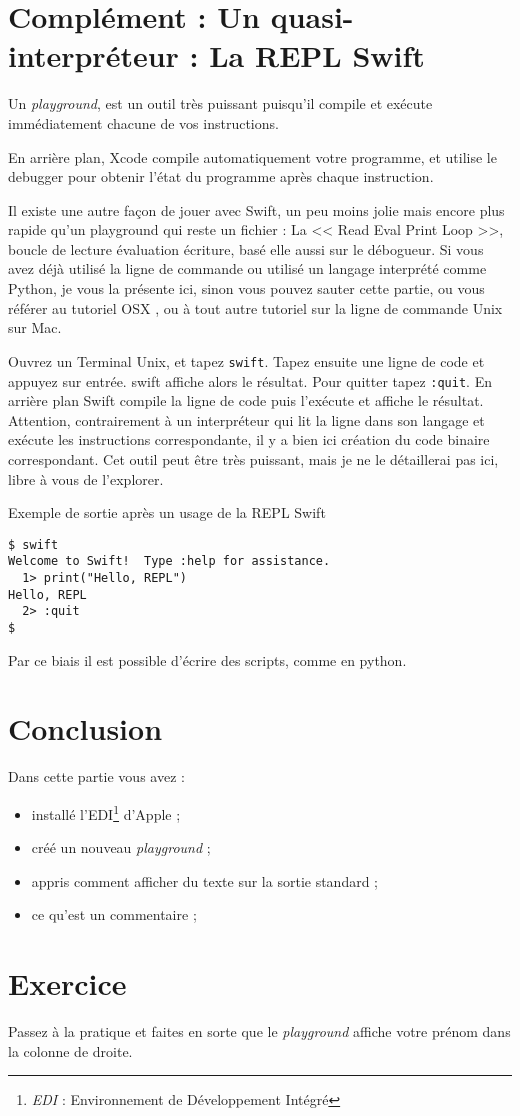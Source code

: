 \section{Complément : Un quasi-interpréteur : La REPL Swift}
Un \emph{playground}, est un outil très puissant
puisqu’il compile et exécute immédiatement
chacune de vos instructions.

En arrière plan, Xcode compile automatiquement votre programme,
et utilise le debugger pour obtenir l’état du programme après chaque instruction.

Il existe une autre façon de jouer avec Swift,
un peu moins jolie mais encore plus rapide qu’un playground
qui reste un fichier :
La << Read Eval Print Loop >>, boucle de lecture évaluation écriture,
basé elle aussi sur le débogueur.
Si vous avez déjà utilisé la ligne de commande
ou utilisé un langage interprété comme Python,
je vous la présente ici, sinon vous pouvez sauter cette partie,
ou vous référer au tutoriel OSX ,
ou à tout autre tutoriel sur la ligne de commande Unix sur Mac.

Ouvrez un Terminal Unix, et tapez \verb"swift".
Tapez ensuite une ligne de code et appuyez sur entrée.
swift affiche alors le résultat.
Pour quitter tapez \verb":quit".
En arrière plan Swift compile la ligne de code
puis l'exécute et affiche le résultat.
Attention, contrairement à un interpréteur qui lit la ligne dans son langage
et exécute les instructions correspondante,
il y a bien ici création du code binaire correspondant.
Cet outil peut être très puissant,
mais je ne le détaillerai pas ici, libre à vous de l’explorer.
\begin{listing}[H]
\caption{Exemple de sortie après un usage de la REPL Swift}
\begin{verbatim}
$ swift
Welcome to Swift!  Type :help for assistance.
  1> print("Hello, REPL")
Hello, REPL
  2> :quit
$
\end{verbatim}
\end{listing}
Par ce biais il est possible d'écrire des scripts, comme en python.



\section*{Conclusion}
{}
Dans cette partie vous avez :
\begin{itemize}
\item installé l'EDI\footnote{\emph{EDI} : Environnement de Développement Intégré} d'Apple ;
\item créé un nouveau \emph{playground} ;
\item appris comment afficher du texte sur la sortie standard ;
\item ce qu'est un commentaire ;
\end{itemize}
\section*{Exercice}
{}
Passez à la pratique et faites en sorte que le \emph{playground} affiche
votre prénom dans la colonne de droite.
